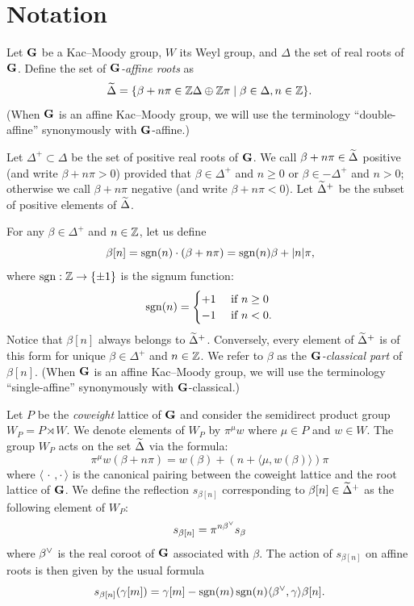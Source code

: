 \documentclass[10pt]{amsart}
\newcommand{\textif}{\text{ if }}\newcommand{\textand}{\text{ and }}\newcommand{\textor}{\text{ or }}\newcommand{\suchthat}{\mid}
\begin{document}
\section{Notation}\label{sec:notation}

Let $\mathbf{G}$ be a Kac--Moody group, $W$ its Weyl group, and $\Delta$ the set of real roots of $\mathbf{G}$. Define the set of \emph{$\mathbf{G}$-affine roots} as
\begin{equation}
\tDelta = \{\beta + n \pi \in \ZZ\Delta\oplus\ZZ\pi \suchthat \beta\in\Delta, n\in \ZZ\}.
\end{equation}
(When $\mathbf{G}$ is an affine Kac--Moody group, we will use the terminology ``double-affine'' synonymously with $\mathbf{G}$-affine.)

Let $\Delta^+\subset\Delta$ be the set of positive real roots of $\mathbf{G}$. We call $\beta+n\pi\in\widetilde{\Delta}$ positive (and write $\beta+n\pi>0$) provided that $\beta\in\Delta^+$ and $n\ge 0$ or $\beta\in -\Delta^+$ and $n>0$; otherwise we call $\beta+n\pi$ negative (and write $\beta+n\pi<0$). Let $\widetilde{\Delta}^+$ be the subset of positive elements of $\widetilde{\Delta}$.

For any $\beta\in\Delta^+$ and $n\in\mathbb{Z}$, let us define
\begin{equation}
\beta[n] = \operatorname{sgn}(n)\cdot (\beta + n \pi) = \operatorname{sgn}(n)\beta + |n| \pi,
\end{equation}
where $\operatorname{sgn} : \mathbb{Z} \rightarrow \{\pm 1\}$ is the signum function:
\begin{equation}\label{eq:020}
\sgn(n) =
\begin{cases}
+ 1 & \textif n \geq 0 \\
- 1 & \textif n < 0.
\end{cases}
\end{equation}
Notice that $\beta[n]$ always belongs to $\widetilde{\Delta}^+$. Conversely, every element of $\widetilde{\Delta}^+$ is of this form for unique $\beta\in\Delta^+$ and $n\in\mathbb{Z}$. We refer to $\beta$ as the \emph{$\mathbf{G}$-classical part} of $\beta[n]$. (When $\mathbf{G}$ is an affine Kac--Moody group, we will use the terminology ``single-affine'' synonymously with $\mathbf{G}$-classical.)

Let $P$ be the \emph{coweight} lattice of $\mathbf{G}$ and consider the semidirect product group $W_P=P\rtimes W$. We denote elements of $W_P$ by $\pi^\mu w$ where $\mu\in P$ and $w\in W$. The group $W_P$ acts on the set $\widetilde{\Delta}$ via the formula:
\begin{equation}
\pi^\mu w(\beta+n\pi) = w(\beta)+(n+\langle \mu, w(\beta)\rangle)\pi
\end{equation}
where $\langle{\,\cdot\,,\cdot\,}\rangle$ is the canonical pairing between the coweight lattice and the root lattice of $\mathbf{G}$. We define the reflection $s_{\beta[n]}$ corresponding to $\beta[n]\in\widetilde{\Delta}^+$ as the following element of $W_{P}$:
\begin{equation}
s_{\beta[n]} = \pi^{n \beta^\vee} s_\beta
\end{equation}
where $\beta^\vee$ is the real coroot of $\mathbf{G}$ associated with $\beta$. The action of $s_{\beta[n]}$ on affine roots is then given by the usual formula
\begin{equation}
s_{\beta[n]}(\gamma[m]) = \gamma[m]- \operatorname{sgn}(m)\operatorname{sgn}(n)\langle\beta^\vee,\gamma\rangle\beta[n].
\end{equation}
\end{document}
